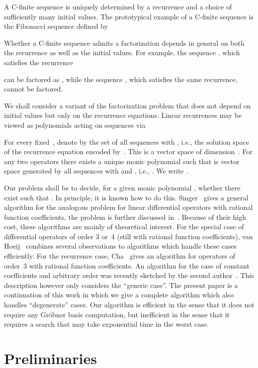 \documentclass{sig-alternate}
\begin{document}
A C-finite sequence is uniquely determined by a recurrence and a choice
of sufficiently many initial values. The prototypical example of a C-finite
sequence is the Fibonacci sequence  defined by

Whether a C-finite sequence  admits a factorization depends
in general on both the recurrence as well as the initial values. For example,
the sequence , which satisfies the recurrence

can be factored as , while the sequence
, which satisfies the same recurrence, cannot be factored.

We shall consider a variant of the factorization problem that does not depend
on initial values but only on the recurrence equations. Linear recurrences
may be viewed as polynomials  acting on
sequences  via

For every fixed~, denote by  the set of all sequences
 with , i.e., the solution
space of the recurrence equation encoded by~.
This is a
vector space of dimension~. For any two operators  there
exists a unique monic polynomial  such that  is
vector space generated by all sequences 
with  and ,
i.e., . We write . 

Our problem shall be to decide, for a given monic polynomial ,
whether there exist  such that . In principle, it is
known how to do this. Singer~\cite{singer85a} gives a general algorithm for the
analogous problem for linear differential operators with rational function
coefficients, the problem is further discussed in~\cite{hessinger97}. Because of their
high cost, these algorithms are mainly of theoretical interest. For the special
case of differential operators of order 3 or~4 (still with rational function
coefficients), van Hoeij~\cite{hoeij07,hoeij02a} combines several observations to 
algorithms which handle these cases efficiently. For the recurrence case,
Cha~\cite{cha14} gives an algorithm for operators of order~3 with rational function
coefficients. An algorithm for the case of constant coefficients and arbitrary
order was recently sketched by the second author~\cite{zeilberger13}. This description
however only considers the ``generic case''. The present paper is a
continuation of this work in which we give a complete algorithm which also
handles ``degenerate'' cases. Our algorithm is efficient in the sense that it
does not require any Gr\"obner basis computation, but inefficient in the sense
that it requires a search that may take exponential time in the worst
case. 

\section{Preliminaries}
\end{document}
